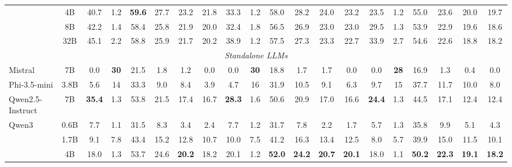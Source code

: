 \begin{table}[t]
{\begin{tabular}{lc|cccccc|cccccc|cccccc}
 & 4B & 40.7 & 1.2 & \cellcolor{gray!15}\textbf{59.6} & \cellcolor{gray!15}27.7 & \cellcolor{gray!15}23.2 & \cellcolor{gray!15}21.8 & 33.3 & 1.2 & \cellcolor{gray!15}58.0 & \cellcolor{gray!15}28.2 & \cellcolor{gray!15}24.0 & \cellcolor{gray!15}23.2 & \cellcolor{gray!15}23.5 & 1.2 & \cellcolor{gray!15}55.0 & \cellcolor{gray!15}23.6 & \cellcolor{gray!15}20.0 & \cellcolor{gray!15}19.7 \\
 & 8B & 42.2 & 1.4 & \cellcolor{gray!15}58.4 & \cellcolor{gray!15}25.8 & \cellcolor{gray!15}21.9 & \cellcolor{gray!15}20.0 & 32.4 & 1.8 & \cellcolor{gray!15}56.5 & \cellcolor{gray!15}26.9 & \cellcolor{gray!15}23.0 & \cellcolor{gray!15}23.0 & 29.5 & 1.3 & \cellcolor{gray!15}53.9 & \cellcolor{gray!15}22.9 & \cellcolor{gray!15}19.6 & \cellcolor{gray!15}18.6 \\
 & 32B & 45.1 & 2.2 & \cellcolor{gray!15}58.8 & \cellcolor{gray!15}25.9 & \cellcolor{gray!15}21.7 & \cellcolor{gray!15}20.2 & 38.9 & 1.2 & \cellcolor{gray!15}57.5 & \cellcolor{gray!15}27.3 & \cellcolor{gray!15}23.3 & \cellcolor{gray!15}22.7 & 33.9 & 2.7 & \cellcolor{gray!15}54.6 & \cellcolor{gray!15}22.6 & \cellcolor{gray!15}18.8 & \cellcolor{gray!15}18.2 \\
\midrule
\multicolumn{20}{c}{\textit{Standalone LLMs}} \\
\midrule
Mistral & 7B & 0.0 & \textbf{30} & 21.5 & 1.8 & 1.2 & 0.0 & 0.0 & \textbf{30} & 18.8 & 1.7 & 1.7 & 0.0 & 0.0 & \textbf{28} & 16.9 & 1.3 & 0.4 & 0.0 \\
Phi-3.5-mini & 3.8B & 5.6 & 14 & 33.3 & 9.0 & 8.4 & 3.9 & 4.7 & 16 & 31.9 & 10.5 & 9.1 & 6.3 & 9.7 & 15 & 37.7 & 11.7 & 10.0 & 8.0 \\
Qwen2.5-Instruct & 7B & \textbf{35.4} & 1.3 & 53.8 & 21.5 & 17.4 & 16.7 & \cellcolor{gray!15}\textbf{28.3} & 1.6 & 50.6 & 20.9 & 17.0 & 16.6 & \cellcolor{gray!15}\textbf{24.4} & 1.3 & 44.5 & 17.1 & 12.4 & 12.4 \\
\multirow{5}{*}{Qwen3} & 0.6B & 7.7 & 1.1 & 31.5 & 8.3 & 3.4 & 2.4 & 7.7 & 1.2 & 31.7 & 7.8 & 2.2 & 1.7 & 5.7 & 1.3 & 35.8 & 9.9 & 5.1 & 4.3 \\
 & 1.7B & 9.1 & 7.8 & 43.4 & 15.2 & 12.8 & 10.7 & 10.0 & 7.5 & 41.2 & 16.3 & 13.4 & 12.5 & 8.0 & 5.7 & 39.9 & 15.0 & 11.5 & 10.1 \\
 & 4B & 18.0 & 1.3 & 53.7 & \cellcolor{gray!15}24.6 & \cellcolor{gray!15}\textbf{20.2} & \cellcolor{gray!15}18.2 & \cellcolor{gray!15}20.1 & 1.2 & \textbf{52.0} & \cellcolor{gray!15}\textbf{24.2} & \cellcolor{gray!15}\textbf{20.7} & \cellcolor{gray!15}\textbf{20.1} & \cellcolor{gray!15}18.0 & 1.1 & \textbf{50.2} & \cellcolor{gray!15}\textbf{22.3} & \cellcolor{gray!15}\textbf{19.1} & \cellcolor{gray!15}\textbf{18.2} \\

\end{tabular}}
\end{table}

